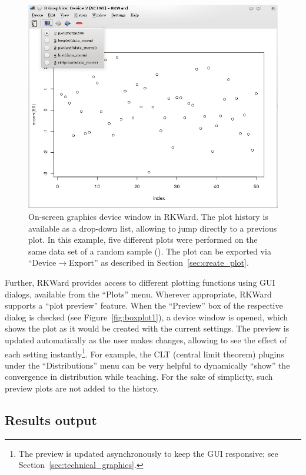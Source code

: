 \begin{figure}[htp]
 \centering
 \includegraphics{../figures/plot_history_cropped.png}
 \caption{On{}-screen graphics device window in RKWard. The plot history is 
  available as a drop-down list, allowing to jump directly to a previous 
  plot. In this example, five different plots were performed on the same data 
  set of a random sample (). The plot can be 
  exported via ``Device$\rightarrow$Export'' as described in Section~\ref{sec:create_plot}.
}
 \label{fig:plot_history}
\end{figure}

Further, RKWard provides access to different plotting functions using GUI dialogs,
available from the ``Plots'' menu. Wherever appropriate, RKWard supports a ``plot
preview'' feature. When the ``Preview'' box of
the respective dialog is checked (see Figure~\ref{fig:boxplot1}), a device window is opened, which
shows the plot as it would be created with the current settings. The
preview is updated automatically as the user makes changes, allowing to
see the effect of each setting instantly\footnote{The preview is
updated asynchronously to keep the GUI responsive; see Section~\ref{sec:technical_graphics}.}. For example, the CLT 
(central limit theorem) plugins
under the ``Distributions'' menu can be very helpful to dynamically ``show''
the convergence in distribution while teaching. For the sake of simplicity, such preview plots are not added to
the history.

\subsection{Results output}
\label{sec:results_output}

